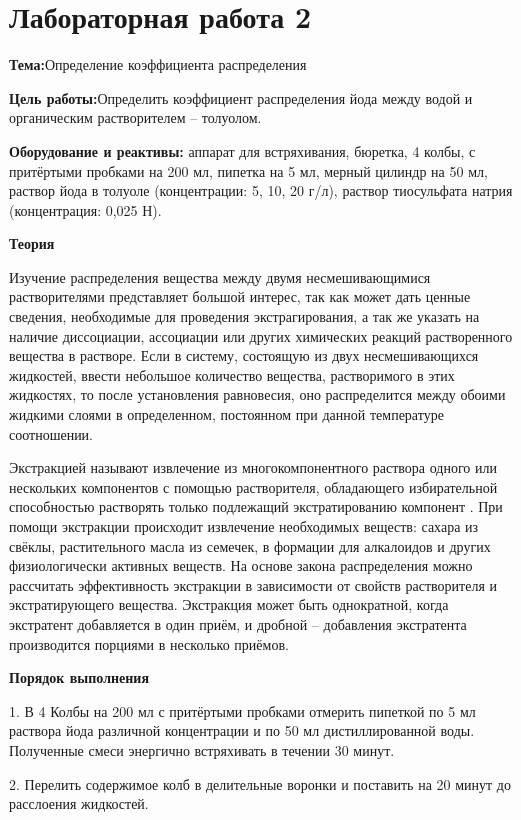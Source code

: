 \section{Лабораторная работа 2 }
\textbf{Тема:}Определение коэффициента распределения

\textbf{Цель работы:}Определить коэффициент распределения йода между водой и органическим растворителем -- толуолом.

\textbf{Оборудование и реактивы:} аппарат для встряхивания, бюретка, 4 колбы, с притёртыми пробками на 200 мл, пипетка на 5 мл, мерный цилиндр на 50 мл, раствор йода в толуоле (концентрации: 5, 10, 20 г/л), раствор тиосульфата натрия (концентрация: 0,025 Н).

\textbf{Теория}

Изучение распределения  вещества между двумя несмешивающимися растворителями представляет большой интерес,  так как может  дать ценные сведения, необходимые для проведения экстрагирования, а так же указать на наличие диссоциации,  ассоциации или других химических  реакций  растворенного  вещества в растворе.  Если в систему, состоящую из двух несмешивающихся жидкостей,  ввести небольшое количество вещества,  растворимого в этих жидкостях,  то после установления равновесия, оно распределится между обоими жидкими слоями в определенном, постоянном при данной температуре соотношении.

Экстракцией называют извлечение из многокомпонентного 
раствора одного или нескольких компонентов с помощью растворителя, обладающего избирательной способностью растворять только подлежащий
экстратированию компонент . При помощи экстракции происходит извлечение необходимых веществ: сахара из свёклы, растительного масла из семечек, в формации для алкалоидов и других физиологически активных веществ.	
На основе закона распределения можно рассчитать эффективность экстракции в зависимости от свойств растворителя и экстратирующего вещества.
Экстракция может быть однократной, когда экстратент добавляется в один приём, и дробной – добавления экстратента производится порциями в несколько приёмов.

\textbf{Порядок выполнения}

1. В 4 Колбы на 200 мл с притёртыми пробками отмерить  пипеткой по 5 мл раствора йода различной концентрации и по 50 мл дистиллированной воды.  Полученные смеси энергично встряхивать в течении 30 минут.

2. Перелить содержимое колб в делительные воронки и поставить на 20 минут до расслоения жидкостей.

